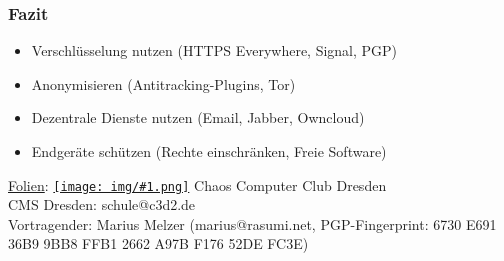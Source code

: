 \documentclass[12pt]{beamer}
\newcommand{\cc}[1]{\texttt{[image: img/\#1.png]}\hspace{1mm}}
\begin{document}
\begin{frame}
  \frametitle{Fazit}
  \begin{center}
    \begin{itemize}
      \item Verschlüsselung nutzen (HTTPS Everywhere, Signal, PGP)
      \item Anonymisieren (Antitracking-Plugins, Tor)
      \item Dezentrale Dienste nutzen (Email, Jabber, Owncloud)
      \item Endgeräte schützen (Rechte einschränken, Freie Software)
    \end{itemize}

    \vspace{5mm}
    \href{https://github.com/c3d2/cms-nsa}{Folien}: \href{https://creativecommons.org/licenses/by-sa/4.0/}{\cc{by-sa}} Chaos Computer Club Dresden \\
    \vspace{3mm}
    CMS Dresden: schule@c3d2.de\\
    Vortragender: Marius Melzer (marius@rasumi.net, PGP-Fingerprint: 6730 E691 36B9 9BB8 FFB1 2662 A97B F176 52DE FC3E)
  \end{center}
\end{frame}
\end{document}

